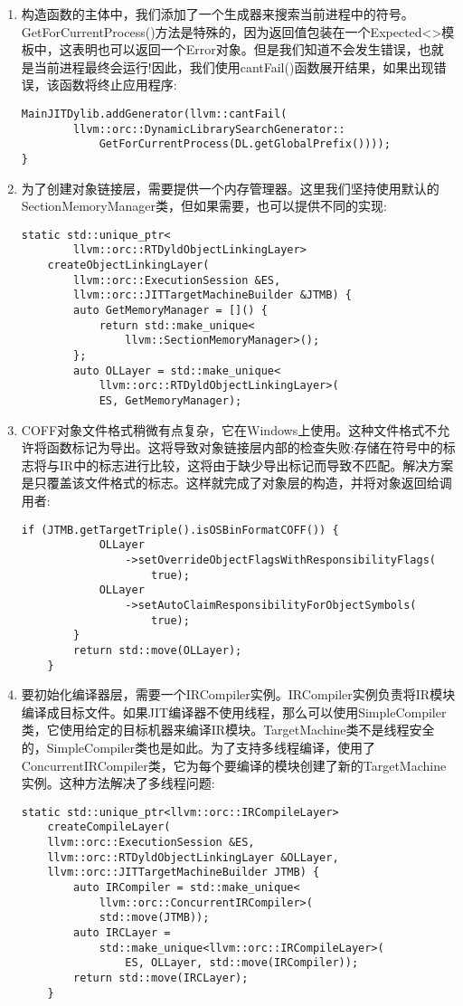 \begin{enumerate}
\item 构造函数的主体中，我们添加了一个生成器来搜索当前进程中的符号。GetForCurrentProcess()方法是特殊的，因为返回值包装在一个Expected<>模板中，这表明也可以返回一个Error对象。但是我们知道不会发生错误，也就是当前进程最终会运行!因此，我们使用cantFail()函数展开结果，如果出现错误，该函数将终止应用程序:
\begin{lstlisting}[caption={}]
	MainJITDylib.addGenerator(llvm::cantFail(
		llvm::orc::DynamicLibrarySearchGenerator::
			GetForCurrentProcess(DL.getGlobalPrefix())));
}
\end{lstlisting}

\item 为了创建对象链接层，需要提供一个内存管理器。这里我们坚持使用默认的SectionMemory\allowbreak Manager类，但如果需要，也可以提供不同的实现:
\begin{lstlisting}[caption={}]
	static std::unique_ptr<
		llvm::orc::RTDyldObjectLinkingLayer>
	createObjectLinkingLayer(
		llvm::orc::ExecutionSession &ES,
		llvm::orc::JITTargetMachineBuilder &JTMB) {
		auto GetMemoryManager = []() {
			return std::make_unique<
				llvm::SectionMemoryManager>();
		};
		auto OLLayer = std::make_unique<
			llvm::orc::RTDyldObjectLinkingLayer>(
			ES, GetMemoryManager);
\end{lstlisting}

\item COFF对象文件格式稍微有点复杂，它在Windows上使用。这种文件格式不允许将函数标记为导出。这将导致对象链接层内部的检查失败:存储在符号中的标志将与IR中的标志进行比较，这将由于缺少导出标记而导致不匹配。解决方案是只覆盖该文件格式的标志。这样就完成了对象层的构造，并将对象返回给调用者:
\begin{lstlisting}[caption={}]
		if (JTMB.getTargetTriple().isOSBinFormatCOFF()) {
			OLLayer
				->setOverrideObjectFlagsWithResponsibilityFlags(
					true);
			OLLayer
				->setAutoClaimResponsibilityForObjectSymbols(
					true);
		}
		return std::move(OLLayer);
	}
\end{lstlisting}

\item 要初始化编译器层，需要一个IRCompiler实例。IRCompiler实例负责将IR模块编译成目标文件。如果JIT编译器不使用线程，那么可以使用SimpleCompiler类，它使用给定的目标机器来编译IR模块。TargetMachine类不是线程安全的，SimpleCompiler类也是如此。为了支持多线程编译，使用了ConcurrentIRCompiler类，它为每个要编译的模块创建了新的TargetMachine实例。这种方法解决了多线程问题:
\begin{lstlisting}[caption={}]
	static std::unique_ptr<llvm::orc::IRCompileLayer>
	createCompileLayer(
	llvm::orc::ExecutionSession &ES,
	llvm::orc::RTDyldObjectLinkingLayer &OLLayer,
	llvm::orc::JITTargetMachineBuilder JTMB) {
		auto IRCompiler = std::make_unique<
			llvm::orc::ConcurrentIRCompiler>(
			std::move(JTMB));
		auto IRCLayer =
			std::make_unique<llvm::orc::IRCompileLayer>(
				ES, OLLayer, std::move(IRCompiler));
		return std::move(IRCLayer);
	}
\end{lstlisting}


\end{enumerate}
